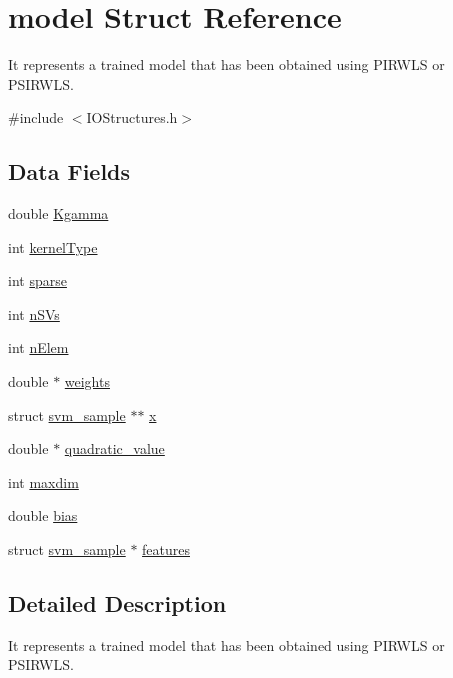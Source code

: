 \hypertarget{structmodel}{}\section{model Struct Reference}
\label{structmodel}


It represents a trained model that has been obtained using P\+I\+R\+W\+LS or P\+S\+I\+R\+W\+LS.  




{\ttfamily \#include $<$I\+O\+Structures.\+h$>$}

\subsection*{Data Fields}
\begin{DoxyCompactItemize}
\item 
double \hyperlink{structmodel_ac5c18eca6ad32bc6da1f2a923965e66c}{Kgamma}
\item 
int \hyperlink{structmodel_aaff8ca8579bd888fcfeca1c682618be9}{kernel\+Type}
\item 
int \hyperlink{structmodel_ad00b5b9bbafcd18eb6367c90d9471231}{sparse}
\item 
int \hyperlink{structmodel_a3b73d79940bbdae365676c4fa56e96ea}{n\+S\+Vs}
\item 
int \hyperlink{structmodel_a4877089d41daf2186482e0e6f900d65f}{n\+Elem}
\item 
double $\ast$ \hyperlink{structmodel_a658dab89d4b4b1a5bd28cdfb4abafe39}{weights}
\item 
struct \hyperlink{structsvm__sample}{svm\+\_\+sample} $\ast$$\ast$ \hyperlink{structmodel_a81da41c8731f95de344a068d302eb336}{x}
\item 
double $\ast$ \hyperlink{structmodel_a623da3d1f5116fd4d66873b95eb2e720}{quadratic\+\_\+value}
\item 
int \hyperlink{structmodel_ac6ba8c1bc138143114cd331583f41387}{maxdim}
\item 
double \hyperlink{structmodel_a9aef7cc709fca4e03a021623ce6c7ae6}{bias}
\item 
struct \hyperlink{structsvm__sample}{svm\+\_\+sample} $\ast$ \hyperlink{structmodel_ac034047dc48ef9be6739e48b13f8f65c}{features}
\end{DoxyCompactItemize}


\subsection{Detailed Description}
It represents a trained model that has been obtained using P\+I\+R\+W\+LS or P\+S\+I\+R\+W\+LS. 


